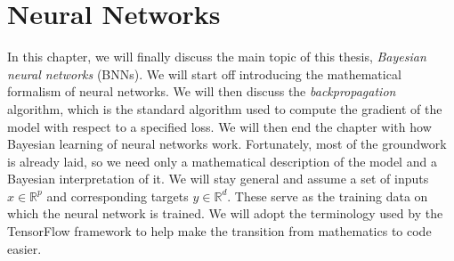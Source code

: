\section{Neural Networks}\label{sec:neural_networks}
In this chapter, we will finally discuss the main topic of this thesis, \textit{Bayesian neural networks} (BNNs).
We will start off introducing the mathematical formalism of neural networks. 
We will then discuss the \textit{backpropagation} algorithm, which is the standard
algorithm used to compute the gradient of the model with respect to a specified loss. 
We will then end the chapter with how Bayesian learning of neural networks work. 
Fortunately, most of the groundwork is already laid, so we need only a mathematical description of the model and a Bayesian interpretation of it. 
We will stay general and assume a set of inputs $x \in \mathbb{R}^p$ and corresponding targets $y \in \mathbb{R}^d$. 
These serve as the training data on which the neural network is trained.
We will adopt the terminology used by the TensorFlow framework \cite{tf} to help make the
transition from mathematics to code easier. 

